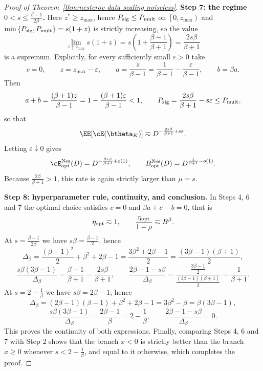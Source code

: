\begin{proof}[Proof of Theorem~\ref{thm:nesterov data scaling noiseless}]
\textbf{Step 7: the regime \(0<s\leq\frac{\beta-1}{2\beta}\).} Here \(z^{*}\geq z_{\max}\), hence \(P_{\rm sig}\leq P_{\rm mult}\) on \(\left[0,z_{\max}\right)\) and \(\min\left\{P_{\rm sig},P_{\rm mult}\right\}=s(1+z)\) is strictly increasing, so the value
\[
    \lim_{z\uparrow z_{\max}}s(1+z)
    =
    s\left(1+\frac{\beta-1}{\beta+1}\right)
    =
    \frac{2s\beta}{\beta+1}
\]
is a supremum. Explicitly, for every sufficiently small \(\varepsilon>0\) take
\[
    c=0,
    \qquad
    z=z_{\max}-\varepsilon,
    \qquad
    a=\frac{z}{\beta-1}=\frac{1}{\beta+1}-\frac{\varepsilon}{\beta-1},
    \qquad
    b=\beta a .
\]
Then
\[
    a+b=\frac{(\beta+1)z}{\beta-1}=1-\frac{(\beta+1)\varepsilon}{\beta-1}<1,
    \qquad
    P_{\rm sig}=\frac{2s\beta}{\beta+1}-s\varepsilon
    \leq
    P_{\rm mult},
\]
so that
\[
    \EE[\cE(\btheta_K)]
    \eqsim
    D^{-\frac{2s\beta}{\beta+1}+s\varepsilon}.
\]
Letting \(\varepsilon\downarrow0\) gives
\[
    \cE_{\rm opt}^{\rm Nes}(D)=D^{-\frac{2s\beta}{\beta+1}+o(1)},
    \qquad
    B_{\rm opt}^{\rm Nes}(D)=D^{\frac{1}{\beta+1}-o(1)} .
\]
Because \(\frac{2\beta}{\beta+1}>1\), this rate is again strictly larger than \(\mu=s\).

\textbf{Step 8: hyperparameter rule, continuity, and conclusion.} In Steps 4, 6 and 7 the optimal choice satisfies \(c=0\) and \(\beta a+c-b=0\), that is
\[
    \eta_{\rm opt}\eqsim1,
    \qquad
    \frac{\eta_{\rm opt}}{1-\rho}\eqsim B^{\beta}.
\]
At \(s=\frac{\beta-1}{2\beta}\) we have \(s\beta=\frac{\beta-1}{2}\), hence
\[
    \Delta_{\beta}
    =
    \frac{(\beta-1)^{2}}{2}+\beta^{2}+2\beta-1
    =
    \frac{3\beta^{2}+2\beta-1}{2}
    =
    \frac{(3\beta-1)(\beta+1)}{2},
\]
\[
    \frac{s\beta(3\beta-1)}{\Delta_{\beta}}
    =
    \frac{\beta-1}{\beta+1}
    =
    \frac{2s\beta}{\beta+1},
    \qquad
    \frac{2\beta-1-s\beta}{\Delta_{\beta}}
    =
    \frac{\frac{3\beta-1}{2}}{\frac{(3\beta-1)(\beta+1)}{2}}
    =
    \frac{1}{\beta+1}.
\]
At \(s=2-\frac1\beta\) we have \(s\beta=2\beta-1\), hence
\[
    \Delta_{\beta}=(2\beta-1)(\beta-1)+\beta^{2}+2\beta-1=3\beta^{2}-\beta=\beta(3\beta-1),
\]
\[
    \frac{s\beta(3\beta-1)}{\Delta_{\beta}}=\frac{2\beta-1}{\beta}=2-\frac1\beta,
    \qquad
    \frac{2\beta-1-s\beta}{\Delta_{\beta}}=0 .
\]
This proves the continuity of both expressions. Finally, comparing Steps 4, 6 and 7 with Step 2 shows that the branch \(x<0\) is strictly better than the branch \(x\geq0\) whenever \(s<2-\frac1\beta\), and equal to it otherwise, which completes the proof.
\end{proof}


